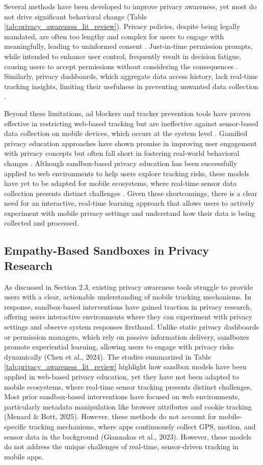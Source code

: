 \documentclass[acmlarge, nonacm]{acmart}
\begin{document}
Several methods have been developed to improve privacy awareness, yet most do not drive significant behavioral change (Table \ref{tab:privacy_awareness_lit_review}). Privacy policies, despite being legally mandated, are often too lengthy and complex for users to engage with meaningfully, leading to uninformed consent \cite{burkhardt2023privacy}. Just-in-time permission prompts, while intended to enhance user control, frequently result in decision fatigue, causing users to accept permissions without considering the consequences \cite{bilogrevic2021shhh}. Similarly, privacy dashboards, which aggregate data access history, lack real-time tracking insights, limiting their usefulness in preventing unwanted data collection \cite{narayanan2024real}.

Beyond these limitations, ad blockers and tracker prevention tools have proven effective in restricting web-based tracking but are ineffective against sensor-based data collection on mobile devices, which occurs at the system level \cite{bian2021supply}. Gamified privacy education approaches have shown promise in improving user engagement with privacy concepts but often fall short in fostering real-world behavioral changes \cite{idierukevbe2024bridging}. Although sandbox-based privacy education has been successfully applied to web environments to help users explore tracking risks, these models have yet to be adapted for mobile ecosystems, where real-time sensor data collection presents distinct challenges \cite{Chaoran2023EmpathySandbox}. Given these shortcomings, there is a clear need for an interactive, real-time learning approach that allows users to actively experiment with mobile privacy settings and understand how their data is being collected and processed.

\subsection{Empathy-Based Sandboxes in Privacy Research}
As discussed in Section 2.3, existing privacy awareness tools struggle to provide users with a clear, actionable understanding of mobile tracking mechanisms. In response, sandbox-based interventions have gained traction in privacy research, offering users interactive environments where they can experiment with privacy settings and observe system responses firsthand. Unlike static privacy dashboards or permission managers, which rely on passive information delivery, sandboxes promote experiential learning, allowing users to engage with privacy risks dynamically (Chen et al., 2024). The studies summarized in Table \ref{tab:privacy_awareness_lit_review} highlight how sandbox models have been applied in web-based privacy education, yet they have not been adapted to mobile ecosystems, where real-time sensor tracking presents distinct challenges. Most prior sandbox-based interventions have focused on web environments, particularly metadata manipulation like browser attributes and cookie tracking (Menard \& Bott, 2025). However, these methods do not account for mobile-specific tracking mechanisms, where apps continuously collect GPS, motion, and sensor data in the background (Giannakas et al., 2023). However, these models do not address the unique challenges of real-time, sensor-driven tracking in mobile apps.
\end{document}
